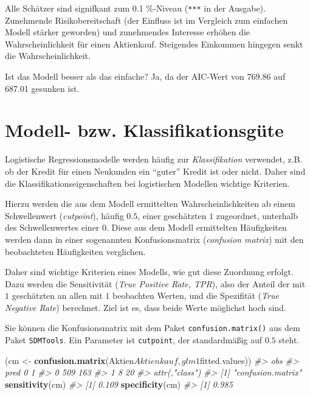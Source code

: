 \documentclass[12pt,ngerman,]{book}
\makeatletter
\newenvironment{Shaded}{\begin{snugshade}}{\end{snugshade}}
\newcommand{\KeywordTok}[1]{\textcolor[rgb]{0.13,0.29,0.53}{\textbf{{#1}}}}
\newcommand{\StringTok}[1]{\textcolor[rgb]{0.31,0.60,0.02}{{#1}}}
\newcommand{\CommentTok}[1]{\textcolor[rgb]{0.56,0.35,0.01}{\textit{{#1}}}}
\newcommand{\NormalTok}[1]{{#1}}
\newenvironment{kframe}{%
\medskip{}
\setlength{\fboxsep}{.8em}
 \def\at@end@of@kframe{}%
 \ifinner\ifhmode%
  \def\at@end@of@kframe{\end{minipage}}%
  \begin{minipage}{\columnwidth}%
 \fi\fi%
 \def\FrameCommand##1{\hskip\@totalleftmargin \hskip-\fboxsep
 \colorbox{shadecolor}{##1}\hskip-\fboxsep
     \hskip-\linewidth \hskip-\@totalleftmargin \hskip\columnwidth}%
 \MakeFramed {\advance\hsize-\width
   \@totalleftmargin\z@ \linewidth\hsize
   \@setminipage}}%
 {\par\unskip\endMakeFramed%
 \at@end@of@kframe}
\renewenvironment{Shaded}{\begin{kframe}}{\end{kframe}}
\makeatother
\begin{document}
Alle Schätzer sind signifkant zum 0.1 \%-Niveau (\texttt{***} in der
Ausgabe). Zunehmende Risikobereitschaft (der Einfluss ist im Vergleich
zum einfachen Modell stärker geworden) und zunehmendes Interesse erhöhen
die Wahrscheinlichkeit für einen Aktienkauf. Steigendes Einkommen
hingegen senkt die Wahrscheinlichkeit.

Ist das Modell besser als das einfache? Ja, da der AIC-Wert von 769.86
auf 687.01 gesunken ist.

\section{Modell- bzw.
Klassifikationsgüte}\label{modell--bzw.-klassifikationsgute}

Logistische Regressionsmodelle werden häufig zur
\emph{Klassifikation} verwendet, z.B. ob der
Kredit für einen Neukunden ein ``guter'' Kredit ist oder nicht. Daher
sind die Klassifikationseigenschaften bei logistischen Modellen wichtige
Kriterien.

Hierzu werden die aus dem Modell ermittelten Wahrscheinlichkeiten ab
einem Schwellenwert (\emph{cutpoint}), häufig \(0.5\), einer geschätzten
\(1\) zugeordnet, unterhalb des Schwellenwertes einer \(0\). Diese aus
dem Modell ermittelten Häufigkeiten werden dann in einer sogenannten
Konfusionsmatrix (\emph{confusion matrix}) mit
den beobachteten Häufigkeiten verglichen.

Daher sind wichtige Kriterien eines Modells, wie gut diese Zuordnung
erfolgt. Dazu werden die Sensitivität (\emph{True Positive Rate, TPR}),
also der Anteil der mit \(1\) geschätzten an allen mit \(1\) beobachten
Werten, und die Spezifität (\emph{True Negative Rate}) berechnet. Ziel
ist es, dass beide Werte möglichst hoch sind.

Sie können die Konfusionsmatrix mit dem Paket
\texttt{confusion.matrix()} aus dem Paket \texttt{SDMTools}. Ein
Parameter ist \texttt{cutpoint}, der standardmäßig auf \(0.5\) steht.

\begin{Shaded}
\begin{Highlighting}[]

\NormalTok{(cm <-}\StringTok{ }\KeywordTok{confusion.matrix}\NormalTok{(Aktien$Aktienkauf, glm1$fitted.values)) }
\CommentTok{#>     obs}
\CommentTok{#> pred   0   1}
\CommentTok{#>    0 509 163}
\CommentTok{#>    1   8  20}
\CommentTok{#> attr(,"class")}
\CommentTok{#> [1] "confusion.matrix"}
\KeywordTok{sensitivity}\NormalTok{(cm)}
\CommentTok{#> [1] 0.109}
\KeywordTok{specificity}\NormalTok{(cm)}
\CommentTok{#> [1] 0.985}
\end{Highlighting}
\end{Shaded}
\end{document}
